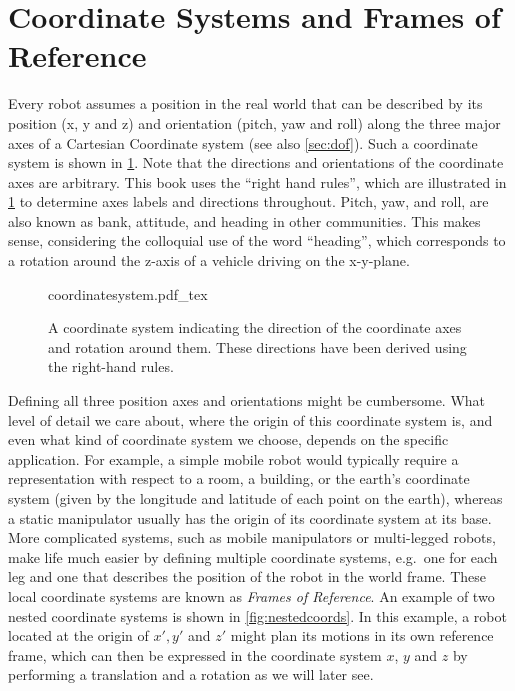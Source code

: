 \section{Coordinate Systems and Frames of Reference}\label{sec:coordsystems}


Every robot assumes a position in the real world that can be described by its position (x, y and z) and orientation (pitch, yaw and roll) along the three major axes of a Cartesian Coordinate system (see also \cref{sec:dof}). Such a coordinate system is shown in \cref{fig:coordinatesystem}. Note that the directions and orientations of the coordinate axes are arbitrary. This book uses the ``right hand rules'', which are illustrated in \cref{fig:coordinatesystem} to determine axes labels and directions throughout. Pitch, yaw, and roll, are also known as bank, attitude, and heading in other communities.  This makes sense, considering the colloquial use of the word ``heading'', which corresponds to a rotation around the z-axis of a vehicle driving on the x-y-plane.

\begin{figure}
    \centering
    \def\svgwidth{0.8\textwidth}
    {coordinatesystem.pdf_tex}
    \caption{A coordinate system indicating the direction of the coordinate axes and rotation around them. These directions have been derived using the right-hand rules.}
    \label{fig:coordinatesystem}
\end{figure}

Defining all three position axes and orientations might be cumbersome. What level of detail we care about, where the origin of this coordinate system is, and even what kind of coordinate system we choose, depends on the specific application. For example, a simple mobile robot would typically require a representation with respect to a room, a building, or the earth's coordinate system (given by the longitude and latitude of each point on the earth), whereas a static manipulator usually has the origin of its coordinate system at its base. More complicated systems, such as mobile manipulators or multi-legged robots, make life much easier by defining multiple coordinate systems, e.g.\ one for each leg and one that describes the position of the robot in the world frame. These local coordinate systems are known as \emph{Frames of Reference}.
An example of two nested coordinate systems is shown in \cref{fig:nestedcoords}. In this example, a robot located at the origin of $x',y'$ and $z'$ might plan its motions in its own reference frame, which can then be expressed in the coordinate system $x$, $y$ and $z$ by performing a translation and a rotation as we will later see.

